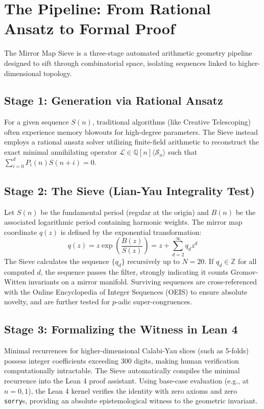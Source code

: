 \documentclass[12pt, reqno]{amsart}
\begin{document}
\section{The Pipeline: From Rational Ansatz to Formal Proof}
The Mirror Map Sieve is a three-stage automated arithmetic geometry pipeline designed to sift through combinatorial space, isolating sequences linked to higher-dimensional topology.

\subsection{Stage 1: Generation via Rational Ansatz}
For a given sequence $S(n)$, traditional algorithms (like Creative Telescoping) often experience memory blowouts for high-degree parameters. The Sieve instead employs a rational ansatz solver utilizing finite-field arithmetic to reconstruct the exact minimal annihilating operator $\mathcal{L} \in \mathbb{Q}[n]\langle \mathcal{S}_n \rangle$ such that $\sum_{i=0}^d P_i(n) S(n+i) = 0$.

\subsection{Stage 2: The Sieve (Lian-Yau Integrality Test)}
Let $S(n)$ be the fundamental period (regular at the origin) and $B(n)$ be the associated logarithmic period containing harmonic weights. The mirror map coordinate $q(z)$ is defined by the exponential transformation:
\begin{equation}
q(z) = z \exp\left( \frac{B(z)}{S(z)} \right) = z + \sum_{d=2}^\infty q_d z^d
\end{equation}
The Sieve calculates the sequence $\{q_d\}$ recursively up to $N=20$. If $q_d \in \mathbb{Z}$ for all computed $d$, the sequence passes the filter, strongly indicating it counts Gromov-Witten invariants on a mirror manifold. Surviving sequences are cross-referenced with the Online Encyclopedia of Integer Sequences (OEIS) to ensure absolute novelty, and are further tested for $p$-adic super-congruences.

\subsection{Stage 3: Formalizing the Witness in Lean 4}
Minimal recurrences for higher-dimensional Calabi-Yau slices (such as 5-folds) possess integer coefficients exceeding 300 digits, making human verification computationally intractable. The Sieve automatically compiles the minimal recurrence into the Lean 4 proof assistant. Using base-case evaluation (e.g., at $n=0, 1$), the Lean 4 kernel verifies the identity with zero axioms and zero \texttt{sorry}s, providing an absolute epistemological witness to the geometric invariant.
\end{document}
